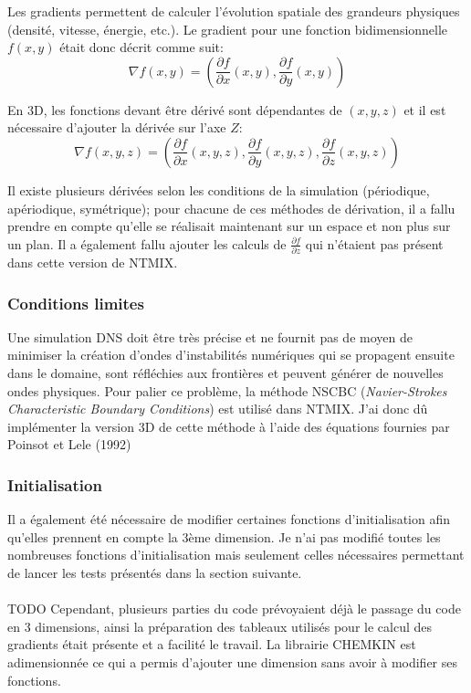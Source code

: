 Les gradients permettent de calculer l'évolution spatiale des grandeurs physiques (densité, vitesse, énergie, etc.). Le gradient pour une fonction bidimensionnelle $f(x,y)$ était donc décrit comme suit:
$$\nabla f(x,y) =\left(\frac{\partial f}{\partial x}(x,y),\frac{\partial f}{\partial y}(x,y)\right) $$

En 3D, les fonctions devant être dérivé sont dépendantes de $(x,y,z)$ et il est nécessaire d'ajouter la dérivée sur l'axe $Z$:
$$ \nabla f(x,y,z) =\left(\frac{\partial f}{\partial x}(x,y,z),\frac{\partial f}{\partial y}(x,y,z),\frac{\partial f}{\partial z}(x,y,z)\right)$$

Il existe plusieurs dérivées selon les conditions de la simulation (périodique, apériodique, symétrique); pour chacune de ces méthodes de dérivation, il a fallu prendre en compte qu'elle se réalisait maintenant sur un espace et non plus sur un plan. Il a également fallu ajouter les calculs de $\frac{\partial f}{\partial z}$ qui n'étaient pas présent dans cette version de NTMIX.

\subsubsection{Conditions limites}\label{sec:nsbc}
Une simulation DNS doit être très précise et ne fournit pas de moyen de minimiser la création d'ondes d'instabilités numériques qui se propagent ensuite dans le domaine, sont réfléchies aux frontières et peuvent générer de nouvelles ondes physiques\cite{baritaud1996direct}. Pour palier ce problème, la méthode NSCBC (\textit{Navier-Strokes Characteristic Boundary Conditions}) est utilisé dans NTMIX. J'ai donc dû implémenter la version 3D de cette méthode à l'aide des équations fournies par Poinsot et Lele (1992)\cite{POINSOT1992104}

\subsubsection{Initialisation}Il a également été nécessaire de modifier certaines fonctions d'initialisation afin qu'elles prennent en compte la 3ème dimension. Je n'ai pas modifié toutes les nombreuses fonctions d'initialisation mais seulement  celles nécessaires permettant de lancer les tests présentés dans la section suivante.


\paragraph{}TODO Cependant, plusieurs parties du code prévoyaient déjà le passage du code en 3 dimensions, ainsi la préparation des tableaux utilisés pour le calcul des gradients était présente et a facilité le travail. La librairie CHEMKIN est adimensionnée ce qui a permis d'ajouter une dimension sans avoir à modifier ses fonctions. 

